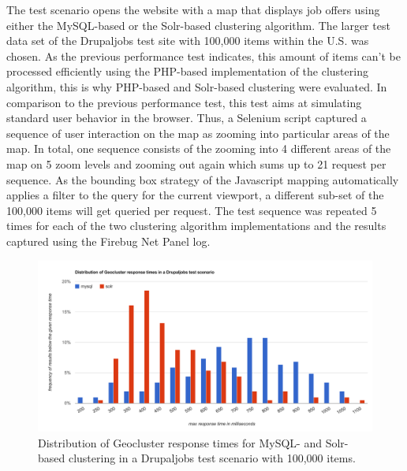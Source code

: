 The test scenario opens the website with a map that displays job offers using either the MySQL-based or the Solr-based clustering algorithm. The larger test data set of the Drupaljobs test site with 100,000 items within the U.S. was chosen. As the previous performance test indicates, this amount of items can't be processed efficiently using the PHP-based implementation of the clustering algorithm, this is why PHP-based and Solr-based clustering were evaluated. In comparison to the previous performance test, this test aims at simulating standard user behavior in the browser. Thus, a Selenium script captured a sequence of user interaction on the map as zooming into particular areas of the map. In total, one sequence consists of the zooming into 4 different areas of the map on 5 zoom levels and zooming out again which sums up to 21 request per sequence. As the bounding box strategy of the Javascript mapping automatically applies a filter to the query for the current viewport, a different sub-set of the 100,000 items will get queried per request. The test sequence was repeated 5 times for each of the two clustering algorithm implementations and the results captured using the Firebug Net Panel log.

\begin{figure}[h]
  \begin{center}
  \hspace*{-1.5cm}\includegraphics[width=1.2\textwidth]{figures/geocluster_response_time_distribution.pdf}
    \caption{Distribution of Geocluster response times for MySQL- and Solr-based clustering in a Drupaljobs test scenario with 100,000 items.}
    \label{fig:real-performance}
  \end{center}
\end{figure}

